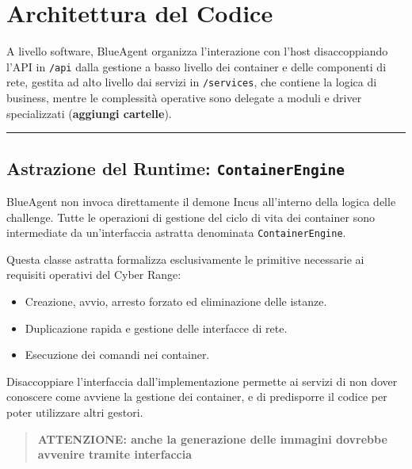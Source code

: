 \section{Architettura del Codice}\label{architettura-del-codice}

A livello software, BlueAgent organizza l'interazione con l'host
disaccoppiando l'API in \passthrough{\lstinline!/api!} dalla gestione a
basso livello dei container e delle componenti di rete, gestita ad alto
livello dai servizi in \passthrough{\lstinline!/services!}, che contiene
la logica di business, mentre le complessità operative sono delegate a
moduli e driver specializzati (\textbf{aggiungi cartelle}).

\begin{center}\rule{0.5\linewidth}{0.5pt}\end{center}

\subsection{\texorpdfstring{Astrazione del Runtime:
\texttt{ContainerEngine}}{Astrazione del Runtime: ContainerEngine}}\label{astrazione-del-runtime-containerengine}

BlueAgent non invoca direttamente il demone Incus all'interno della
logica delle challenge. Tutte le operazioni di gestione del ciclo di
vita dei container sono intermediate da un'interfaccia astratta
denominata \passthrough{\lstinline!ContainerEngine!}.

Questa classe astratta formalizza esclusivamente le primitive necessarie
ai requisiti operativi del Cyber Range:

\begin{itemize}
\tightlist
\item
  Creazione, avvio, arresto forzato ed eliminazione delle istanze.
\item
  Duplicazione rapida e gestione delle interfacce di rete.
\item
  Esecuzione dei comandi nei container.
\end{itemize}

Disaccoppiare l'interfaccia dall'implementazione permette ai servizi di
non dover conoscere come avviene la gestione dei container, e di
predisporre il codice per poter utilizzare altri gestori.

\begin{quote}
\textbf{ATTENZIONE: anche la generazione delle immagini dovrebbe
avvenire tramite interfaccia}
\end{quote}


